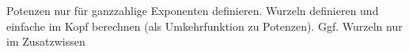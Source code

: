\documentclass[../../main.tex]{subfiles}
\begin{document}
    Potenzen nur für ganzzahlige Exponenten definieren. Wurzeln definieren und einfache im Kopf berechnen 
    (als Umkehrfunktion zu Potenzen). Ggf. Wurzeln nur im Zusatzwissen
\end{document}

